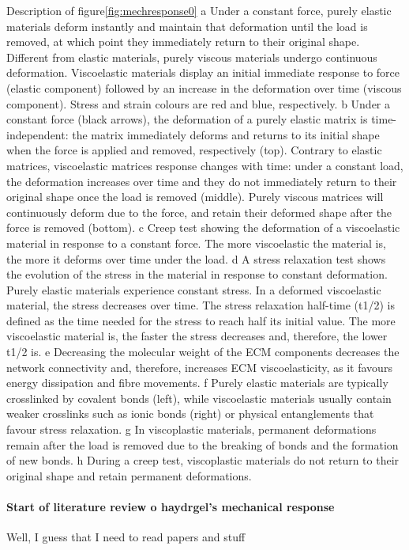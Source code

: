 Description of figure\ref{fig:mechresponse0} 
a Under a constant force, purely elastic materials deform instantly and maintain that deformation until the load is removed, at which point they immediately return to their original shape. Different from elastic materials, purely viscous materials undergo continuous deformation. Viscoelastic materials display an initial immediate response to force (elastic component) followed by an increase in the deformation over time (viscous component). Stress and strain colours are red and blue, respectively. b Under a constant force (black arrows), the deformation of a purely elastic matrix is time-independent: the matrix immediately deforms and returns to its initial shape when the force is applied and removed, respectively (top). Contrary to elastic matrices, viscoelastic matrices response changes with time: under a constant load, the deformation increases over time and they do not immediately return to their original shape once the load is removed (middle). Purely viscous matrices will continuously deform due to the force, and retain their deformed shape after the force is removed (bottom). c Creep test showing the deformation of a viscoelastic material in response to a constant force. The more  viscoelastic the material is, the more it deforms over time under the load. d A stress relaxation test shows the evolution of the stress in the material in response to constant deformation. Purely elastic materials experience constant stress. In a deformed viscoelastic material, the stress decreases over time. The stress relaxation half-time (t1/2) is defined as the time needed for the stress to reach half its initial value. The more viscoelastic material is, the faster the stress decreases and, therefore, the lower t1/2 is. e Decreasing the molecular weight of the ECM components decreases the network connectivity and, therefore, increases ECM viscoelasticity, as it favours energy dissipation and fibre movements. f Purely elastic materials are typically crosslinked by covalent bonds (left), while viscoelastic materials usually contain weaker crosslinks such as ionic bonds (right) or physical entanglements that favour stress relaxation. g In viscoplastic materials, permanent deformations remain after the load is removed due to the breaking of bonds and the formation of new bonds. h During a creep test, viscoplastic materials do not return to their original shape and retain permanent deformations\citep{courbotRoleExtracellularMatrix2025}.

\paragraph{Start of literature review o haydrgel's mechanical response} Well, I guess that I need to read papers and stuff%




